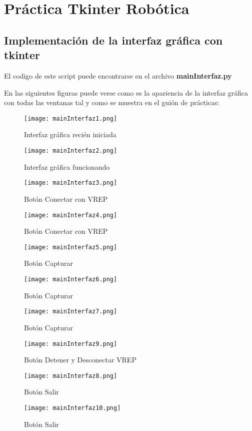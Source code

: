 \chapter{Práctica Tkinter Robótica}

\section{Implementación de la interfaz gráfica con tkinter}

El codigo de este script puede encontrarse en el archivo \textbf{mainInterfaz.py}

En las siguientes figuras puede verse como es la apariencia de la interfaz gráfica con todas las ventanas tal y como se muestra en el guión de prácticas:

\begin{figure}[H]
	\centering
	\texttt{[image: mainInterfaz1.png]}
	\caption{Interfaz gráfica recién iniciada}
\end{figure}
\begin{figure}[H]
	\centering
	\texttt{[image: mainInterfaz2.png]}
	\caption{Interfaz gráfica funcionando}
\end{figure}
\begin{figure}[H]
	\centering
	\texttt{[image: mainInterfaz3.png]}
	\caption{Botón Conectar con VREP}
\end{figure}
\begin{figure}[H]
	\centering
	\texttt{[image: mainInterfaz4.png]}
	\caption{Botón Conectar con VREP}
\end{figure}
\begin{figure}[H]
	\centering
	\texttt{[image: mainInterfaz5.png]}
	\caption{Botón Capturar}
\end{figure}
\begin{figure}[H]
	\centering
	\texttt{[image: mainInterfaz6.png]}
	\caption{Botón Capturar}
\end{figure}
\begin{figure}[H]
	\centering
	\texttt{[image: mainInterfaz7.png]}
	\caption{Botón Capturar}
\end{figure}
\begin{figure}[H]
	\centering
	\texttt{[image: mainInterfaz9.png]}
	\caption{Botón Detener y Desconectar VREP}
\end{figure}
\begin{figure}[H]
	\centering
	\texttt{[image: mainInterfaz8.png]}
	\caption{Botón Salir}
\end{figure}
\begin{figure}[H]
	\centering
	\texttt{[image: mainInterfaz10.png]}
	\caption{Botón Salir}
\end{figure}

